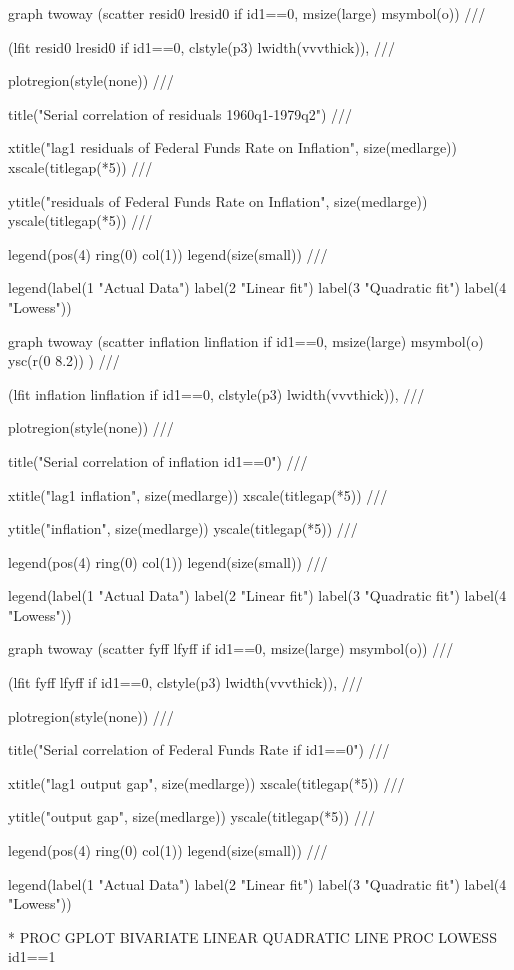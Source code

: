 \documentclass[12pt,a4paper]{article}%
\begin{document}
graph twoway (scatter resid0 lresid0 if id1==0, msize(large) msymbol(o)) ///

(lfit resid0 lresid0 if id1==0, clstyle(p3) lwidth(vvvthick)), ///

plotregion(style(none)) ///

title("Serial correlation of residuals 1960q1-1979q2") ///

xtitle("lag1 residuals of Federal Funds Rate on Inflation", size(medlarge))
xscale(titlegap(*5)) ///

ytitle("residuals of Federal Funds Rate on Inflation", size(medlarge))
yscale(titlegap(*5)) ///

legend(pos(4) ring(0) col(1)) legend(size(small)) ///

legend(label(1 "Actual Data") label(2 "Linear fit") label(3 "Quadratic fit")
label(4 "Lowess"))

graph twoway (scatter inflation linflation if id1==0, msize(large) msymbol(o)
ysc(r(0 8.2)) ) ///

(lfit inflation linflation if id1==0, clstyle(p3) lwidth(vvvthick)), ///

plotregion(style(none)) ///

title("Serial correlation of inflation id1==0") ///

xtitle("lag1 inflation", size(medlarge)) xscale(titlegap(*5)) ///

ytitle("inflation", size(medlarge)) yscale(titlegap(*5)) ///

legend(pos(4) ring(0) col(1)) legend(size(small)) ///

legend(label(1 "Actual Data") label(2 "Linear fit") label(3 "Quadratic fit")
label(4 "Lowess"))

graph twoway (scatter fyff lfyff if id1==0, msize(large) msymbol(o)) ///

(lfit fyff lfyff if id1==0, clstyle(p3) lwidth(vvvthick)), ///

plotregion(style(none)) ///

title("Serial correlation of Federal Funds Rate if id1==0") ///

xtitle("lag1 output gap", size(medlarge)) xscale(titlegap(*5)) ///

ytitle("output gap", size(medlarge)) yscale(titlegap(*5)) ///

legend(pos(4) ring(0) col(1)) legend(size(small)) ///

legend(label(1 "Actual Data") label(2 "Linear fit") label(3 "Quadratic fit")
label(4 "Lowess"))

* PROC GPLOT BIVARIATE LINEAR QUADRATIC LINE PROC LOWESS id1==1
\end{document}
